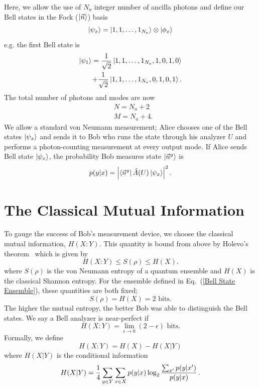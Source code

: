 \documentclass[aps,pra,twocolumn,showpacs,superscriptaddress,floatfix,10pt]{revtex4}
\begin{document}
Here, we allow the use of $N_a$ integer number of ancilla photons and define our Bell states in the Fock ($\ket{\vec{n}}$) basis
\begin{equation}
\label{Bell States Phi}
	\ket{\psi_x} = \ket{1,1,\dots,1_{N_a}} \otimes \ket{\phi_x}
\end{equation}
e.g. the first Bell state is
\begin{eqnarray}
	\ket{\psi_1} = \frac{1}{\sqrt{2}}  \ket{1,1,\dots,1_{N_a},1,0,1,0} \\
	+ \frac{1}{\sqrt{2}} \ket{1,1,\dots,1_{N_a},0,1,0,1}. \nonumber 
\end{eqnarray}
The total number of photons and modes are now
\begin{eqnarray}
	& N = N_a + 2 \\
	& M = N_a + 4.
\end{eqnarray}
We allow a standard von Neumann measurement; Alice chooses one of the Bell states $\ket{\psi_x}$ and sends it to Bob who runs the state through his analyzer $U$ and performs a photon-counting measurement at every output mode.
If Alice sends Bell state $\ket{\psi_x}$, the probability Bob measures state $\ket{\vec{n}^y}$ is
\begin{equation}
	\label{Probability of Measurment}
	p( y | x ) = \abs{\bra{\vec{n}^y} \hat{A}(U) \ket{\psi_x}}^2 \, .
\end{equation}
\section{The Classical Mutual Information}
\label{Section on Mutual Entropy}
To gauge the success of Bob's measurement device, we choose the classical mutual information, $H(X:Y)$. This quantity is bound from above by Holevo's theorem~\cite{Holevo,Hausladen} which is
given by
\begin{equation}
\label{Holevo Theorem}
H(X:Y) \le S(\rho) \le H(X).
\end{equation}
where $S(\rho)$ is the von Neumann entropy of a quantum ensemble and $H(X)$ is the classical Shannon entropy.
For the ensemble defined in Eq.~(\ref{Bell State Ensemble}), these quantities are both fixed;
\begin{equation}
	S(\rho) = H(X) = \mbox{2 bits}.
\end{equation}
The higher the mutual entropy, the better Bob was able to distinguish the Bell states. We say a Bell analyzer is near-perfect if
\begin{equation}
	\label{Near Perfect Condition}
	H(X:Y) = \lim\limits_{\epsilon \rightarrow 0} (2 - \epsilon) \mbox{ bits.}
\end{equation}
Formally, we define
\begin{equation}
	\label{Mutual Entropy}
	H(X:Y) = H(X) - H(X|Y)
\end{equation}
where $H(X|Y)$ is the conditional information
\begin{equation}
\label{Conditional Entropy}
\small
H(X|Y) = \frac{1}{4} \sum_{y \in Y} \sum_{x \in X} p(y|x) \log_2 \frac{\sum_{x^\prime} p(y|x^\prime)}{p(y|x)}\,.
\end{equation}
\end{document}
